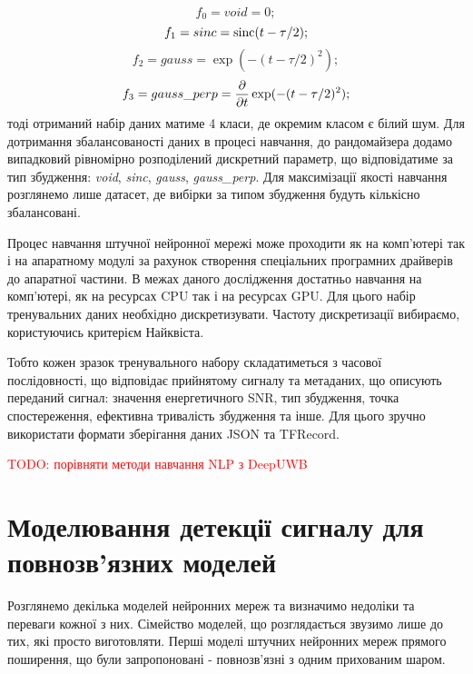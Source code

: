 \begin{equation} \label{eq:type_void}
f_0 = void = 0;
\end{equation}
%
\begin{equation} \label{eq:type_sinc}
f_1 = sinc = \operatorname{sinc}(t-\tau/2);
\end{equation}
%
\begin{equation} \label{eq:type_gauss}
f_2 = gauss = \exp(- (t-\tau/2)^2 );
\end{equation}
%
\begin{equation} \label{eq:type_gauss_perp}
f_3 = gauss\_perp = \frac{\partial }{\partial t} \exp(- (t-\tau/2)^2 );
\end{equation}
%
тоді отриманий набір даних матиме 4 класи, де окремим класом є білий шум. Для
дотримання збалансованості даних в процесі навчання, до рандомайзера додамо 
випадковий рівномірно розподілений дискретний параметр, що відповідатиме 
за тип збудження: \textit{void}, \textit{sinc}, \textit{gauss}, 
\textit{gauss\_perp}. Для максимізації якості навчання розглянемо 
лише датасет, де вибірки за типом збудження будуть кількісно збалансовані. 

Процес навчання штучної нейронної мережі може проходити як на комп'ютері так і 
на апаратному модулі за рахунок створення спеціальних програмних драйверів
до апаратної частини. В межах даного дослідження 
достатньо навчання на комп'ютері, як на ресурсах CPU так і на ресурсах GPU.
Для цього набір тренувальних даних необхідно дискретизувати. Частоту 
дискретизації вибираємо, користуючись критерієм Найквіста.

Тобто кожен зразок тренувального набору складатиметься з часової
послідовності, що відповідає прийнятому сигналу та метаданих, що описують 
переданий сигнал: значення енергетичного SNR, тип збудження, 
точка спостереження, ефективна тривалість збудження та інше. Для цього
зручно використати формати зберігання даних JSON та TFRecord.

\textcolor{red}{TODO: порівняти методи навчання NLP з DeepUWB}

\section{Моделювання детекції сигналу для повнозв'язних моделей}

Розглянемо декілька моделей нейронних мереж та визначимо недоліки та переваги
кожної з них. Сімейство моделей, що розглядається звузимо лише до тих, які 
просто виготовляти. Перші моделі штучних нейронних мереж прямого 
поширення, що були запропоновані - повнозв'язні з одним прихованим шаром.

